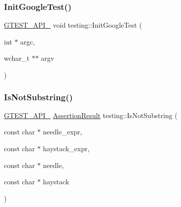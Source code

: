 \mbox{\label{namespacetesting_a6e9d83553f1d10818d698d45689d8adb}} 
\subsubsection{\texorpdfstring{InitGoogleTest()}{InitGoogleTest()}\hspace{0.1cm}{\footnotesize\ttfamily [2/2]}}
{\footnotesize\ttfamily \mbox{\hyperlink{gtest-port_8h_aa73be6f0ba4a7456180a94904ce17790}{G\+T\+E\+S\+T\+\_\+\+A\+P\+I\+\_\+}} void testing\+::\+Init\+Google\+Test (\begin{DoxyParamCaption}\item[{int $\ast$}]{argc,  }\item[{wchar\+\_\+t $\ast$$\ast$}]{argv }\end{DoxyParamCaption})}

\mbox{\label{namespacetesting_ab553b649b06ef2339cbd90f8dfa119f0}} 
\subsubsection{\texorpdfstring{IsNotSubstring()}{IsNotSubstring()}\hspace{0.1cm}{\footnotesize\ttfamily [1/3]}}
{\footnotesize\ttfamily \mbox{\hyperlink{gtest-port_8h_aa73be6f0ba4a7456180a94904ce17790}{G\+T\+E\+S\+T\+\_\+\+A\+P\+I\+\_\+}} \mbox{\hyperlink{classtesting_1_1_assertion_result}{Assertion\+Result}} testing\+::\+Is\+Not\+Substring (\begin{DoxyParamCaption}\item[{const char $\ast$}]{needle\+\_\+expr,  }\item[{const char $\ast$}]{haystack\+\_\+expr,  }\item[{const char $\ast$}]{needle,  }\item[{const char $\ast$}]{haystack }\end{DoxyParamCaption})}

\mbox{\label{namespacetesting_a28868925c50d541c8568a540b6457e54}} 
